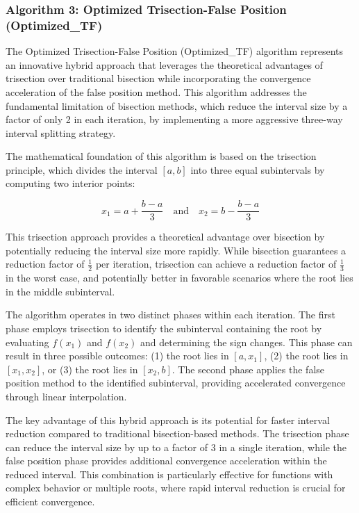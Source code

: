 \documentclass[amsmath, amssymb, aps]{revtex4-2}
\begin{document}
\subsubsection{Algorithm 3: Optimized Trisection-False Position (Optimized\_TF)}

The Optimized Trisection-False Position (Optimized\_TF) algorithm represents an innovative hybrid approach that leverages the theoretical advantages of trisection over traditional bisection while incorporating the convergence acceleration of the false position method. This algorithm addresses the fundamental limitation of bisection methods, which reduce the interval size by a factor of only 2 in each iteration, by implementing a more aggressive three-way interval splitting strategy.

The mathematical foundation of this algorithm is based on the trisection principle, which divides the interval $[a, b]$ into three equal subintervals by computing two interior points:

\begin{equation}
x_1 = a + \frac{b - a}{3} \quad \text{and} \quad x_2 = b - \frac{b - a}{3}
\end{equation}

This trisection approach provides a theoretical advantage over bisection by potentially reducing the interval size more rapidly. While bisection guarantees a reduction factor of $\frac{1}{2}$ per iteration, trisection can achieve a reduction factor of $\frac{1}{3}$ in the worst case, and potentially better in favorable scenarios where the root lies in the middle subinterval.

The algorithm operates in two distinct phases within each iteration. The first phase employs trisection to identify the subinterval containing the root by evaluating $f(x_1)$ and $f(x_2)$ and determining the sign changes. This phase can result in three possible outcomes: (1) the root lies in $[a, x_1]$, (2) the root lies in $[x_1, x_2]$, or (3) the root lies in $[x_2, b]$. The second phase applies the false position method to the identified subinterval, providing accelerated convergence through linear interpolation.

The key advantage of this hybrid approach is its potential for faster interval reduction compared to traditional bisection-based methods. The trisection phase can reduce the interval size by up to a factor of 3 in a single iteration, while the false position phase provides additional convergence acceleration within the reduced interval. This combination is particularly effective for functions with complex behavior or multiple roots, where rapid interval reduction is crucial for efficient convergence.
\end{document}
